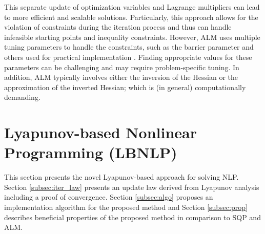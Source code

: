 \documentclass[journal]{IEEEtranTIE}
\begin{document}
This separate update of optimization variables and Lagrange multipliers can lead to more efficient and scalable solutions. %
Particularly, this approach allows for the violation of constraints during the iteration process and thus can handle infeasible starting points and inequality constraints. However, ALM uses multiple tuning parameters to handle the constraints, such as the barrier parameter and others used for practical implementation \cite{conn2013lancelot}. Finding appropriate values for these parameters can be challenging and may require problem-specific tuning. In addition, ALM typically involves either the inversion of the Hessian or the approximation of the inverted Hessian; which is (in general) computationally demanding.


\section{Lyapunov-based Nonlinear Programming (LBNLP)}
\label{sec:Lyapunov-based NLP}

This section presents the novel Lyapunov-based approach for solving NLP. Section \ref{subsec:iter_law} presents an update law derived from Lyapunov analysis including a proof of convergence. Section \ref{subsec:algo} proposes an implementation algorithm for the proposed method and Section \ref{subsec:prop} describes beneficial properties of the proposed method in comparison to SQP and ALM.
\end{document}
